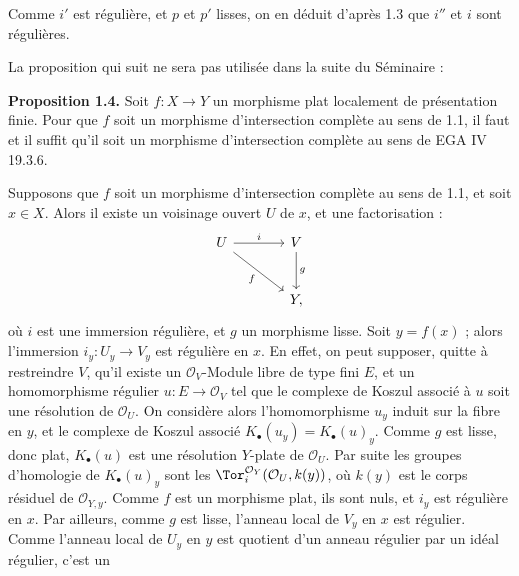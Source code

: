 Comme $i'$ est régulière, et $p$ et $p'$ lisses, on en déduit d'après 1.3 que $i''$ et $i$ sont régulières.

La proposition qui suit ne sera pas utilisée dans la suite du Séminaire :

\textbf{Proposition 1.4.} Soit $f:X\to Y$ un morphisme plat localement de présentation finie. Pour que $f$ soit un morphisme d'intersection complète au sens de 1.1, il faut et il suffit qu'il soit un morphisme d'intersection complète au sens de EGA IV 19.3.6.

Supposons que $f$ soit un morphisme d'intersection complète au sens de 1.1, et soit $x\in X$. Alors il existe un voisinage ouvert $U$ de $x$, et une factorisation :
\[
\begin{tikzcd}[column sep=large,row sep=large]
U \arrow[r,"i"] \arrow[dr,"f"'] & V \arrow[d,"g"]\\
& Y,
\end{tikzcd}
\]
où $i$ est une immersion régulière, et $g$ un morphisme lisse. Soit $y=f(x)$ ; alors l'immersion $i_y:U_y\to V_y$ est régulière en $x$. En effet, on peut supposer, quitte à restreindre $V$, qu'il existe un $\mathcal O_V$-Module libre de type fini $E$, et un homomorphisme régulier $u:E\to\mathcal O_V$ tel que le complexe de Koszul associé à $u$ soit une résolution de $\mathcal O_U$. On considère alors l'homomorphisme $u_y$ induit sur la fibre en $y$, et le complexe de Koszul associé $K_\bullet(u_y)=K_\bullet(u)_y$. Comme $g$ est lisse, donc plat, $K_\bullet(u)$ est une résolution $Y$-plate de $\mathcal O_U$. Par suite les groupes d'homologie de $K_\bullet(u)_y$ sont les $\Tor_i^{\mathcal O_Y}(\mathcal O_U,k(y))$, où $k(y)$ est le corps résiduel de $\mathcal O_{Y,y}$. Comme $f$ est un morphisme plat, ils sont nuls, et $i_y$ est régulière en $x$. Par ailleurs, comme $g$ est lisse, l'anneau local de $V_y$ en $x$ est régulier. Comme l'anneau local de $U_y$ en $y$ est quotient d'un anneau régulier par un idéal régulier, c'est un
